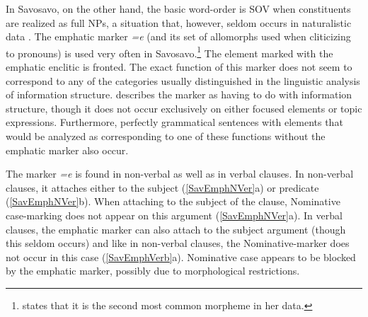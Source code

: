 In Savosavo, on the other hand, the basic word-order is SOV when constituents are realized as full NPs, a situation that, however, seldom occurs in naturalistic data \citep[199--200]{Wegener:2008}. 
The emphatic marker \emph{=e} (and its set of allomorphs used when cliticizing to pronouns) is used very often in Savosavo.\footnote{\citet[221]{Wegener:2008} states that it is the second most common morpheme in her data.}
The element marked with the emphatic enclitic is fronted.
The exact function of this marker does not seem to correspond to any of the categories usually distinguished in the linguistic analysis of information structure.
\citet[228--229]{Wegener:2008} describes the marker as having to do with information structure, though it does not occur exclusively on either focused elements or topic expressions. Furthermore, perfectly grammatical sentences with elements that would be analyzed as corresponding to one of these functions without the emphatic marker also occur. 

The marker \emph{=e} is found in non-verbal as well as in verbal clauses. 
In non-verbal clauses, it attaches either to the subject (\ref{SavEmphNVer}a) or predicate (\ref{SavEmphNVer}b). 
When attaching to the subject of the clause, Nominative case-marking does not appear on this argument (\ref{SavEmphNVer}a). 
In verbal clauses, the emphatic marker can also attach to the subject argument (though this seldom occurs) and like in non-verbal clauses, the Nominative-marker does not occur in this case (\ref{SavEmphVerb}a). 
Nominative case appears to be blocked by the emphatic marker, possibly due to morphological restrictions. 

